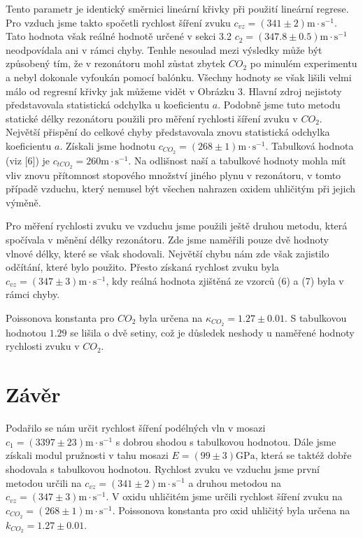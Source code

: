 Tento parametr je identický směrnici lineární křivky při použití lineární regrese. Pro vzduch jsme takto spočetli rychlost šíření zvuku $c_{vz} = (341 \pm 2) \mathrm{m \cdot s^{-1}}$. Tato hodnota však reálné hodnotě určené v sekci 3.2 $c_2 = (347.8 \pm 0.5) \mathrm{m \cdot s^{-1}}$ neodpovídala ani v rámci chyby. Tenhle nesoulad mezi výsledky může být způsobený tím, že v rezonátoru mohl zůstat zbytek $CO_2$ po minulém experimentu a nebyl dokonale vyfoukán pomocí balónku.
Všechny hodnoty se však lišili velmi málo od regresní křivky jak můžeme vidět v Obrázku 3. Hlavní zdroj nejistoty představovala statistická odchylka u koeficientu $a$.
Podobně jsme tuto metodu statické délky rezonátoru použili pro měření rychlosti šíření zvuku v $CO_2$. Největší přispění do celkové chyby představovala znovu statistická odchylka koeficientu $a$. Získali jsme hodnotu $c_{CO_2} = (268 \pm 1)\mathrm{m \cdot s^{-1}}$. Tabulková hodnota (viz [6]) je $c_{tCO_2} = 260 \mathrm{m \cdot s^{-1}}$. Na odlišnost naší a tabulkové hodnoty mohla mít vliv znovu přítomnost stopového množství jiného plynu v rezonátoru, v tomto případě vzduchu, který nemusel být všechen nahrazen oxidem uhličitým při jejich výměně.
\par Pro měření rychlosti zvuku ve vzduchu jsme použili ještě druhou metodu, která spočívala v měnění délky rezonátoru. Zde jsme naměřili pouze dvě hodnoty vlnové délky, které se však shodovali. Největší chybu nám zde však zajistilo odčítání, které bylo použito. Přesto získaná rychlost zvuku byla $c_{vz} = (347 \pm 3)\mathrm{m \cdot s^{-1}}$, kdy reálná hodnota zjištěná ze vzorců (6) a (7) byla v rámci chyby. 
\par Poissonova konstanta pro $CO_2$ byla určena na $\kappa_{CO_2} = 1.27 \pm 0.01$. S tabulkovou hodnotou $1.29$ se lišila o dvě setiny, což je důsledek neshody u naměřené hodnoty rychlosti zvuku v $CO_2$. 



\section{Závěr}
\par Podařilo se nám určit rychlost šíření podélných vln v mosazi $c_1 = (3397 \pm 23)\mathrm{m \cdot s^{-1}}$ s dobrou shodou s tabulkovou hodnotou. Dále jsme získali modul pružnosti v tahu mosazi $E = (99 \pm 3)\mathrm{GPa}$, která se taktéž dobře shodovala s tabulkovou hodnotou.
Rychlost zvuku ve vzduchu jsme první metodou určili na $c_{vz}  = (341 \pm 2)\mathrm{m \cdot s^{-1}}$ a druhou metodou na  $c_{vz}  = (347 \pm 3)\mathrm{m \cdot s^{-1}}$. V oxidu uhličitém jsme určili rychlost šíření zvuku na $c_{CO_2}  = (268 \pm 1)\mathrm{m \cdot s^{-1}}$. Poissonova konstanta pro oxid uhličitý byla určena na $k_{CO_2} = 1.27 \pm 0.01$.













